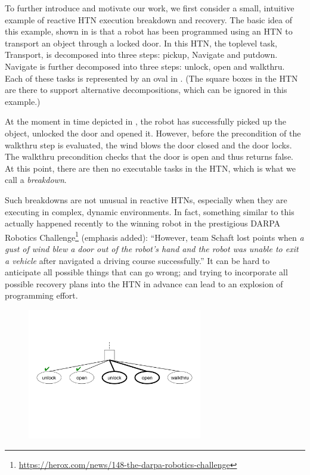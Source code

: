 \documentclass{llncs}
\begin{document}

\noindent To further introduce and motivate our work, we first
consider a small, intuitive example of reactive HTN execution
breakdown and recovery.  The basic idea of this example, shown in
 is that a robot has been programmed using an HTN to
transport an object through a locked door.  In this HTN, the toplevel
task, Transport, is decomposed into three steps: pickup, Navigate and
putdown.  Navigate is further decomposed into three steps: unlock,
open and walkthru.  Each of these tasks is represented by an oval in
.  (The square boxes in the HTN are there to support
alternative decompositions, which can be ignored in this example.)

At the moment in time depicted in , the robot has
successfully picked up the object, unlocked the door and opened it.
However, before the precondition of the walkthru step is evaluated,
the wind blows the door closed and the door locks.  The walkthru
precondition checks that the door is open and thus returns false.  At
this point, there are then no executable tasks in the HTN, which is
what we call a \emph{breakdown}.

Such breakdowns are not unusual in reactive HTNs, especially when they
are executing in complex, dynamic environments. In fact, something
similar to this actually happened recently to the winning robot in the
prestigious DARPA Robotics Challenge\footnote{\url{https://herox.com/news/148-the-darpa-robotics-challenge}} (emphasis added):
``However, team Schaft lost points when \emph{a gust of wind blew a
  door out of the robot's hand and the robot was unable to exit a
  vehicle} after navigated a driving course successfully.''  It can be
hard to anticipate all possible things that can go wrong; and trying to
incorporate all possible recovery plans into the HTN in advance can
lead to an explosion of programming effort.

\begin{figure}[t]
\centerline{\includegraphics[width=3in]{figs/recover}}
\vskip 8pt
\end{figure}
\end{document}
